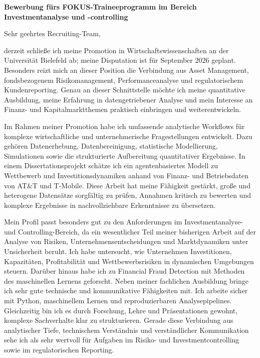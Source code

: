 \documentclass[11pt]{article}
\begin{document}
\vspace{0.05cm}

\noindent
\textbf{Bewerbung fürs FOKUS-Traineeprogramm im Bereich Investmentanalyse und -controlling}

\noindent Sehr geehrtes Recruiting-Team,

derzeit schlie\ss{}e ich meine Promotion in Wirtschaftswissenschaften an der Universität Bielefeld ab; meine Disputation ist für September 2026 geplant. Besonders reizt mich an dieser Position die Verbindung aus Asset Management, fondsbezogenem Risikomanagement, Performanceanalyse und regulatorischem Kundenreporting. Genau an dieser Schnittstelle möchte ich meine quantitative Ausbildung, meine Erfahrung in datengetriebener Analyse und mein Interesse an Finanz- und Kapitalmarktthemen praktisch einbringen und weiterentwickeln.

Im Rahmen meiner Promotion habe ich umfassende analytische Workflows für komplexe wirtschaftliche und unternehmerische Fragestellungen entwickelt. Dazu gehören Datenerhebung, Datenbereinigung, statistische Modellierung, Simulationen sowie die strukturierte Aufbereitung quantitativer Ergebnisse. In einem Dissertationsprojekt schätze ich ein agentenbasiertes Modell zu Wettbewerb und Investitionsdynamiken anhand von Finanz- und Betriebsdaten von AT\&T und T-Mobile. Diese Arbeit hat meine Fähigkeit gestärkt, gro\ss{}e und heterogene Datensätze sorgfältig zu prüfen, Annahmen kritisch zu bewerten und komplexe Ergebnisse in nachvollziehbare Erkenntnisse zu übersetzen.

Mein Profil passt besonders gut zu den Anforderungen im Investmentanalyse- und Controlling-Bereich, da ein wesentlicher Teil meiner bisherigen Arbeit auf der Analyse von Risiken, Unternehmensentscheidungen und Marktdynamiken unter Unsicherheit beruht. Ich habe untersucht, wie Unternehmen Investitionen, Kapazitäten, Profitabilität und Wettbewerbsrisiken in dynamischen Umgebungen steuern. Darüber hinaus habe ich zu Financial Fraud Detection mit Methoden des maschinellen Lernens geforscht. 
Neben meiner fachlichen Ausbildung bringe ich sehr gute technische und kommunikative Fähigkeiten mit. Ich arbeite sicher mit Python, maschinellem Lernen und reproduzierbaren Analysepipelines. Gleichzeitig bin ich es durch Forschung, Lehre und Präsentationen gewohnt, komplexe Sachverhalte klar zu strukturieren. Gerade diese Verbindung aus analytischer Tiefe, technischem Verständnis und verständlicher Kommunikation sehe ich als sehr wertvoll für Aufgaben im Risiko- und Investmentcontrolling sowie im regulatorischen Reporting.
\end{document}
